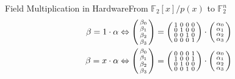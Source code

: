 \begin{frame}{Field Multiplication in Hardware}{From $\mathbb{F}_2[x]/p(x)$ to $\mathbb{F}_2^n$}
{\begin{align*}
            \beta = 1 \cdot \alpha &\Leftrightarrow \begin{psmallmatrix} \beta_0 \\ \beta_1 \\ \beta_2 \\ \beta_3 \end{psmallmatrix} = \begin{psmallmatrix} 1 & 0 & 0 & 0 \\ 0 & 1 & 0 & 0 \\ 0 & 0 & 1 & 0 \\ 0 & 0 & 0 & 1 \end{psmallmatrix} \cdot \begin{psmallmatrix} \alpha_0 \\ \alpha_1 \\ \alpha_2 \\ \alpha_3 \end{psmallmatrix}\\
            \beta = x \cdot \alpha &\Leftrightarrow \begin{psmallmatrix} \beta_0 \\ \beta_1 \\ \beta_2 \\ \beta_3 \end{psmallmatrix} = \begin{psmallmatrix} 0 & 0 & 0 & 1 \\ 1 & 0 & 0 & 1 \\ 0 & 1 & 0 & 0 \\ 0 & 0 & 1 & 0 \end{psmallmatrix} \cdot \begin{psmallmatrix} \alpha_0 \\ \alpha_1 \\ \alpha_2 \\ \alpha_3 \end{psmallmatrix}
        \end{align*}
    }
\end{frame}

